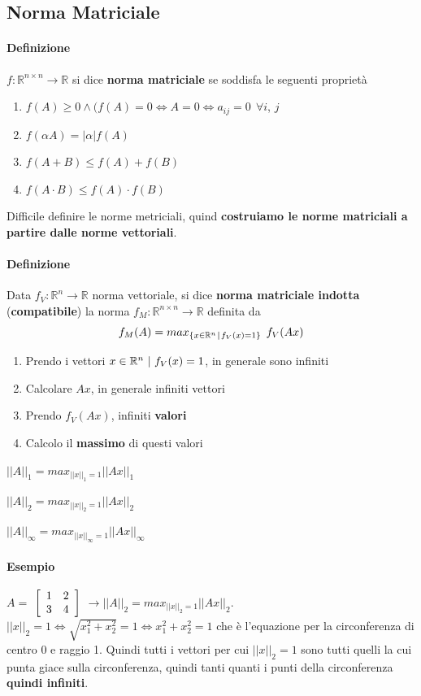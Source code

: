 \documentclass[10pt]{book}
\begin{document}
\subsection{Norma Matriciale}
\paragraph{Definizione} $f: \mathbb{R}^{n \times n} \rightarrow \mathbb{R}$ si dice \textbf{norma matriciale} se soddisfa le seguenti proprietà
\begin{enumerate}
	\item $f(A) \geq 0 \wedge (f(A) = 0 \Leftrightarrow A = 0 \Leftrightarrow a_{ij} = 0\:\:\forall i$, $j$
	\item $f(\alpha A) = |\alpha| f(A)$
	\item $f(A + B) \leq f(A) + f(B)$
	\item $f(A\cdot B) \leq f(A)\cdot f(B)$
\end{enumerate}
Difficile definire le norme metriciali, quind \textbf{costruiamo le norme matriciali a partire dalle norme vettoriali}.
\paragraph{Definizione} Data $f_V: \mathbb{R}^n \rightarrow \mathbb{R}$ norma vettoriale, si dice \textbf{norma matriciale indotta} (\textbf{compatibile}) la norma $f_M: \mathbb{R}^{n \times n} \rightarrow \mathbb{R}$ definita da
$$f_M(A) = max_{\{x \in \mathbb{R}^n\:\vline\:f_V(x) = 1\}}\:\:f_V(Ax)$$
\begin{enumerate}
	\item Prendo i vettori $x \in \mathbb{R}^n\:\:\vline\:\:f_V(x) = 1$, in generale sono infiniti
	\item Calcolare $Ax$, in generale infiniti vettori
	\item Prendo $f_V(Ax)$, infiniti \textbf{valori}
	\item Calcolo il \textbf{massimo} di questi valori
\end{enumerate}
\begin{list}{}{}
	\item $||A||_1 = max_{||x||_1 = 1} ||Ax||_1$
	\item $||A||_2 = max_{||x||_2 = 1} ||Ax||_2$
	\item $||A||_\infty = max_{||x||_\infty = 1} ||Ax||_\infty$
\end{list}
\paragraph{Esempio} $A = $
	\begin{math}
		\left[
		\begin{array}{c c}
			1 & 2\\
			3 & 4
		\end{array}
		\right]
	\end{math}
$\rightarrow ||A||_2 = max_{||x||_2 = 1} ||Ax||_2$.\\
$||x||_2 = 1 \Leftrightarrow \sqrt{x_1^2 + x_2^2} = 1 \Leftrightarrow x_1^2 + x_2^2 = 1$ che è l'equazione per la circonferenza di centro 0 e raggio 1. Quindi tutti i vettori per cui $||x||_2 = 1$ sono tutti quelli la cui punta giace sulla circonferenza, quindi tanti quanti i punti della circonferenza \textbf{quindi infiniti}.
\end{document}
